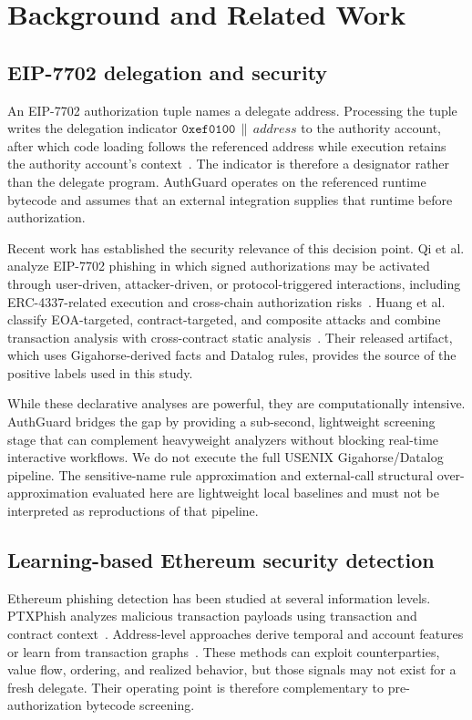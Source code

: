 \documentclass[conference]{IEEEtran}
\begin{document}
\section{Background and Related Work}
\label{sec:background_related}

\subsection{EIP-7702 delegation and security}

An EIP-7702 authorization tuple names a delegate address. Processing the tuple writes the delegation indicator $\mathtt{0xef0100}\,\|\,\textit{address}$ to the authority account, after which code loading follows the referenced address while execution retains the authority account's context~\cite{eip7702}. The indicator is therefore a designator rather than the delegate program. AuthGuard operates on the referenced runtime bytecode and assumes that an external integration supplies that runtime before authorization.

Recent work has established the security relevance of this decision point. Qi et al. analyze EIP-7702 phishing in which signed authorizations may be activated through user-driven, attacker-driven, or protocol-triggered interactions, including ERC-4337-related execution and cross-chain authorization risks~\cite{qi2025eip7702phishing}. Huang et al. classify EOA-targeted, contract-targeted, and composite attacks and combine transaction analysis with cross-contract static analysis~\cite{huang2026darkside}. Their released artifact, which uses Gigahorse-derived facts and Datalog rules, provides the source of the positive labels used in this study. 

While these declarative analyses are powerful, they are computationally intensive. AuthGuard bridges the gap by providing a sub-second, lightweight screening stage that can complement heavyweight analyzers without blocking real-time interactive workflows. We do not execute the full USENIX Gigahorse/Datalog pipeline. The sensitive-name rule approximation and external-call structural over-approximation evaluated here are lightweight local baselines and must not be interpreted as reproductions of that pipeline.

\subsection{Learning-based Ethereum security detection}

Ethereum phishing detection has been studied at several information levels. PTXPhish analyzes malicious transaction payloads using transaction and contract context~\cite{chen2025ptxphish}. Address-level approaches derive temporal and account features or learn from transaction graphs~\cite{chen2020ijcai,chen2020toit}. These methods can exploit counterparties, value flow, ordering, and realized behavior, but those signals may not exist for a fresh delegate. Their operating point is therefore complementary to pre-authorization bytecode screening.
\end{document}
